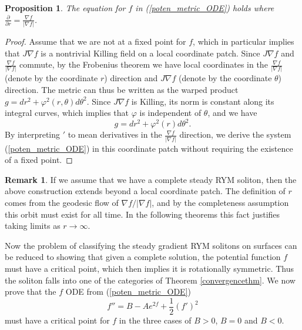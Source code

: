 \documentclass[12pt, a4paper, reqno, oneside]{amsart}
\renewcommand{\phi}{\varphi}
\numberwithin{equation}{section}
\theoremstyle{plain}
\newtheorem{proposition}[theorem]{Proposition}
\theoremstyle{definition}
\newtheorem{remark}[theorem]{Remark}
\theoremstyle{plain}
\begin{document}
\begin{proposition}
  The equation for $f$ in (\ref{poten_metric_ODE}) holds where $\frac{\partial}{\partial r} = \frac{\nabla f}{|\nabla f|}$.
\end{proposition}
\begin{proof}
  Assume that we are not at a fixed point for $f$, which in particular implies that $J\nabla f$ is a nontrivial Killing field on a local coordinate patch. Since $J\nabla f$ and $\tfrac{\nabla f}{|\nabla f|}$ commute, by the Frobenius theorem we have local coordinates in the $\tfrac{\nabla f}{|\nabla f|}$ (denote by the coordinate $r$) direction and $J\nabla f$ (denote by the coordinate $\theta$) direction. The metric can thus be written as the warped product $g = dr^{2}+\phi^{2}(r,\theta)d\theta^{2}$. Since $J\nabla f$ is Killing, its norm is constant along its integral curves, which implies that $\phi$ is independent of $\theta$, and we have
  \[
    g=dr^{2}+\phi^{2}(r)d\theta^{2}.
  \]
  By interpreting $'$ to mean derivatives in the $\tfrac{\nabla f}{|\nabla f|}$ direction, we derive the system (\ref{poten_metric_ODE}) in this coordinate patch without requiring the existence of a fixed point.
\end{proof}

\begin{remark}
  If we assume that we have a complete steady RYM soliton, then the above construction extends beyond a local coordinate patch. The definition of $r$ comes from the geodesic flow of $\nabla f/|\nabla f|$, and by the completeness assumption this orbit must exist for all time. In the following theorems this fact justifies taking limits as $r\to\infty$. 
\end{remark}

Now the problem of classifying the steady gradient RYM solitons on surfaces can be reduced to showing that given a complete solution, the potential function $f$ must have a critical point, which then implies it is rotationally symmetric. Thus the soliton falls into one of the categories of Theorem \ref{convergencethm}. We now prove that the $f$ ODE from (\ref{poten_metric_ODE})
\[
    f'' = B-Ae^{2f}+\frac{1}{2}(f')^{2}
\]
must have a critical point for $f$ in the three cases of $B>0$, $B=0$ and $B<0$.
\end{document}
